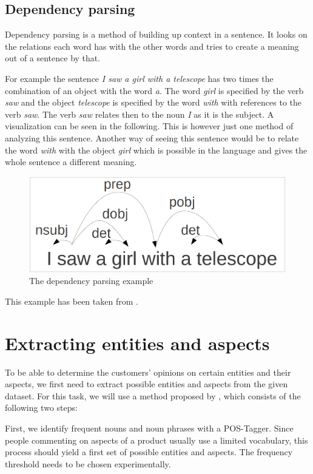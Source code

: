 \documentclass[10pt,a4paper]{article}
\begin{document}
		\subsection{Dependency parsing}
		
		Dependency parsing is a method of building up context in a sentence.
		It looks on the relations each word has with the other words and tries to create a meaning out of a sentence by that.
		
		For example the sentence \textit{I saw a girl with a telescope} has two times the combination of an object with the word \textit{a}. 
		The word \textit{girl} is specified by the verb \textit{saw} and the object \textit{telescope} is specified by the word \textit{with} with references to the verb \textit{saw}. 
		The verb \textit{saw} relates then to the noun \textit{I} as it is the subject. 		
		A visualization can be seen in the following.
		This is however just one method of analyzing this sentence.
		Another way of seeing this sentence would be to relate the word \textit{with} with the object \textit{girl} which is possible in the language and gives the whole sentence a different meaning.
		
		\begin{figure}[h]
			\centering
			\includegraphics[width=0.8\linewidth]{data/dependency}
			\caption{The dependency parsing example}
			\label{fig:dependency}
		\end{figure}
		
		This example has been taken from \cite{dependency}.
	
	\section{Extracting entities and aspects}
	\label{sec:extraction}
	To be able to determine the customers' opinions on certain entities and their aspects, we first need to extract possible entities and aspects from the given dataset. For this task, we will use a method proposed by \cite{Hu:2004:MSC:1014052.1014073}, which consists of the following two steps:
	
	First, we identify frequent nouns and noun phrases with a POS-Tagger. Since people commenting on aspects of a product usually use a limited vocabulary, this process should yield a first set of possible entities and aspects. The frequency threshold needs to be chosen experimentally.
	
\end{document}
